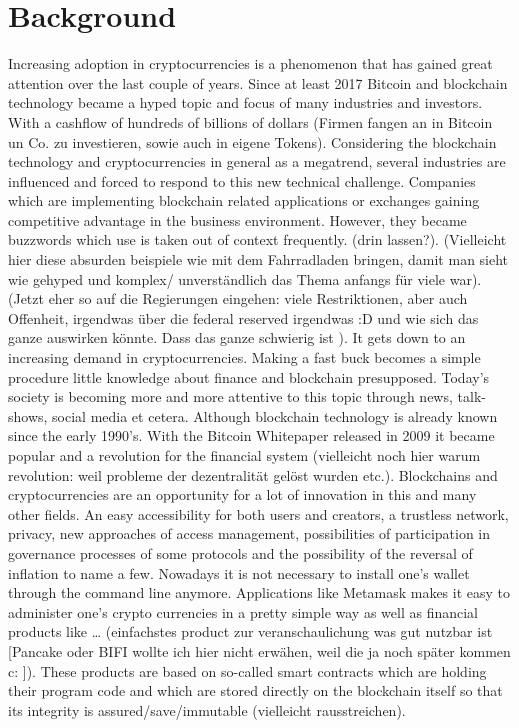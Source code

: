 \section{Background}
Increasing adoption in cryptocurrencies is a phenomenon that has gained great attention over the last couple of years. Since at least 2017 Bitcoin and blockchain technology became a hyped topic and focus of many industries and investors. With a cashflow of hundreds of billions of dollars (Firmen fangen an in Bitcoin un Co. zu investieren, sowie auch in eigene Tokens). Considering the blockchain technology and cryptocurrencies in general as a megatrend, several industries are influenced and forced to respond to this new technical challenge. Companies which are implementing blockchain related applications or exchanges gaining competitive advantage in the business environment. However, they became buzzwords which use is taken out of context frequently. (drin lassen?). (Vielleicht hier diese absurden beispiele wie mit dem Fahrradladen bringen, damit man sieht wie gehyped und komplex/ unverständlich das Thema anfangs für viele war).
(Jetzt eher so auf die Regierungen eingehen: viele Restriktionen, aber auch Offenheit, irgendwas über die federal reserved irgendwas :D und wie sich das ganze auswirken könnte. Dass das ganze schwierig ist ). 
It gets down to an increasing demand in cryptocurrencies. Making a fast buck becomes a simple procedure little knowledge about finance and blockchain presupposed. Today’s society is becoming more and more attentive to this topic through news, talk-shows, social media et cetera.
Although blockchain technology is already known since the early 1990’s. With the Bitcoin Whitepaper released in 2009 it became popular and a revolution for the financial system (vielleicht noch hier warum revolution: weil probleme der dezentralität gelöst wurden etc.). Blockchains and cryptocurrencies are an opportunity for a lot of innovation in this and many other fields. An easy accessibility for both users and creators, a trustless network, privacy, new approaches of access management, possibilities of participation in governance processes of some protocols and the possibility of the reversal of inflation to name a few.
Nowadays it is not necessary to install one’s wallet through the command line anymore. Applications like Metamask makes it easy to administer one’s crypto currencies in a pretty simple way as well as financial products like … (einfachstes product zur veranschaulichung was gut nutzbar ist [Pancake oder BIFI wollte ich hier nicht erwähen, weil die ja noch später kommen c: ]). These products are based on so-called smart contracts which are holding their program code and which are stored directly on the blockchain itself so that its integrity is assured/save/immutable (vielleicht rausstreichen). 

